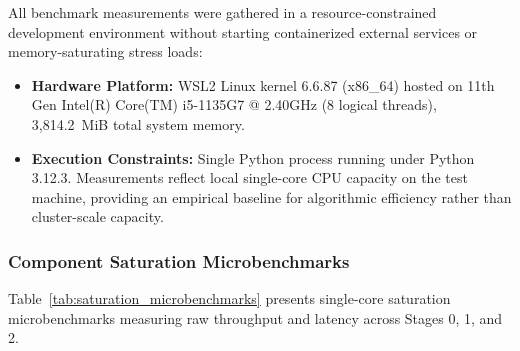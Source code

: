 \documentclass[a4paper]{article}
\begin{document}
All benchmark measurements were gathered in a resource-constrained development environment without starting containerized external services or memory-saturating stress loads:
\begin{itemize}
    \item \textbf{Hardware Platform:} WSL2 Linux kernel 6.6.87 (x86\_64) hosted on 11th Gen Intel(R) Core(TM) i5-1135G7 @ 2.40GHz (8 logical threads), 3,814.2~MiB total system memory.
    \item \textbf{Execution Constraints:} Single Python process running under Python 3.12.3. Measurements reflect local single-core CPU capacity on the test machine, providing an empirical baseline for algorithmic efficiency rather than cluster-scale capacity.
\end{itemize}

\subsubsection{Component Saturation Microbenchmarks}
Table~\ref{tab:saturation_microbenchmarks} presents single-core saturation microbenchmarks measuring raw throughput and latency across Stages 0, 1, and 2.
\end{document}

